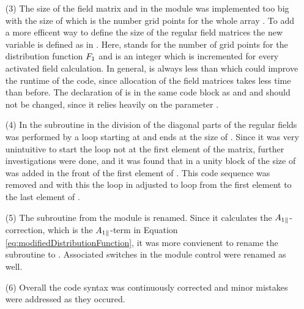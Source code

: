 \begin{enumerate}
    \item[(3)] The size of the field matrix  and  in the module  was implemented too big with the size of  which is the number grid points for the whole array . To add a more efficent way to define the size of the regular field matrices the new variable  is defined as  in . Here,  stands for the number of grid points for the distribution function $F_1$ and  is an integer which is incremented for every activated field calculation. In general,  is always less than  which could improve the runtime of the code, since allocation of the field matrices takes less time than before. The declaration of  is in the same code block as  and  and should not be changed, since it relies heavily on the parameter .
    
    \item[(4)] In the subroutine  in  the division of the diagonal parts of the regular fields was performed by a loop starting at  and ends at the size of . Since it was very unintuitive to start the loop not at the first element of the matrix, further investigations were done, and it was found that in  a unity block of the size of  was added in the front of the first element of . This code sequence was removed and with this the loop in  adjusted to loop from the first element to the last element of .
    
    \item[(5)] The subroutine  from the module  is renamed. Since it calculates the $A_{1\parallel}$-correction, which is the $A_{1\parallel}$-term in Equation \ref{eq:modifiedDistributionFunction}, it was more convienent to rename the subroutine to . Associated switches in the module control were renamed as well.
    \item[(6)] Overall the code syntax was continuously corrected and minor mistakes were addressed as they occured. 
\end{enumerate} 

\newpage